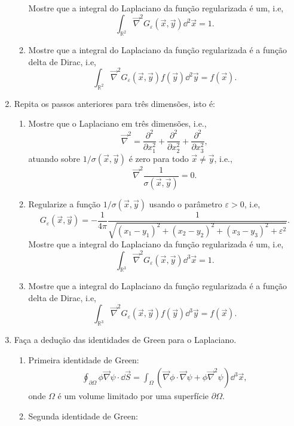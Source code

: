 \begin{enumerate}
\begin{enumerate}
		            Mostre que a integral do Laplaciano da função regularizada é um, i.e,
		            $$\int_{\mathbb{R}^2}\vec\nabla^2G_\varepsilon(\vec{x},\vec{y})\dd^2\vec{x} = 1.$$
		      \item Mostre que a integral do Laplaciano da função regularizada é a função delta de Dirac,
		            i.e,
		            $$\int_{\mathbb{R}^2}\vec\nabla^2G_\varepsilon(\vec{x},\vec{y})f(\vec{y})\dd^2\vec{y} = f(\vec{x}).$$
	      \end{enumerate}
	\item Repita os passos anteriores para três dimensões, isto é:
	      \begin{enumerate}
		      \item Mostre que o Laplaciano em três dimensões, i.e.,
		            $$\vec\nabla^2 = \frac{\partial^2}{\partial x_1^2}+\frac{\partial^2}{\partial x_2^2}+\frac{\partial^2}{\partial x_3^2},$$
		            atuando sobre $1/\sigma(\vec{x},\vec{y})$ é zero para todo $\vec{x}\neq\vec{y}$, i.e.,
		            $$\vec\nabla^2\frac{1}{\sigma(\vec{x},\vec{y})} = 0.$$
		      \item Regularize a função $1/\sigma(\vec{x},\vec{y})$ usando
		            o parâmetro $\varepsilon>0$, i.e,
		            $$G_\varepsilon(\vec{x},\vec{y}) = -\frac{1}{4\pi}\frac{1}{\sqrt{(x_1-y_1)^2+(x_2-y_2)^2+(x_3-y_3)^2+\varepsilon^2}}.$$
		            Mostre que a integral do Laplaciano da função regularizada é um, i.e,
		            $$\int_{\mathbb{R}^3}\vec\nabla^2G_\varepsilon(\vec{x},\vec{y})\dd^3\vec{x} = 1.$$
		      \item Mostre que a integral do Laplaciano da função regularizada é a função delta de Dirac,
		            i.e,
		            $$\int_{\mathbb{R}^3}\vec\nabla^2G_\varepsilon(\vec{x},\vec{y})f(\vec{y})\dd^3\vec{y} = f(\vec{x}).$$
	      \end{enumerate}
	\item Faça a dedução das identidades de Green para o Laplaciano.
	      \begin{enumerate}
		      \item Primeira identidade de Green:
		            \begin{align}
			            \oint_{\partial\Omega}\phi\vec\nabla\psi\cdot\dd\vec{S} =
			            \int_{\Omega}\left(\vec\nabla\phi\cdot\vec\nabla\psi+\phi\vec\nabla^2\psi\right)\dd^3\vec{x},
		            \end{align}
		            onde $\Omega$ é um volume limitado por uma superfície $\partial\Omega$.
		      \item Segunda identidade de Green:

\end{enumerate}
\end{enumerate}
